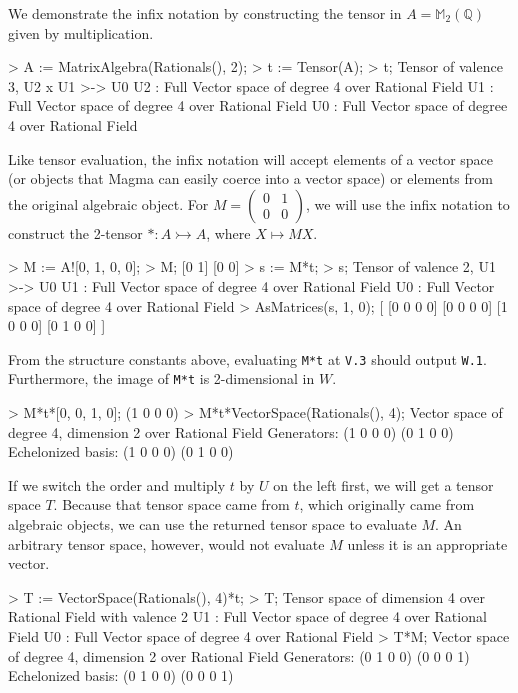 \begin{example}[BimapInfix]

We demonstrate the infix notation by constructing the tensor in
$A=\mathbb{M}_2(\mathbb{Q})$ given by multiplication.
\begin{code}
> A := MatrixAlgebra(Rationals(), 2);
> t := Tensor(A);
> t;
Tensor of valence 3, U2 x U1 >-> U0
U2 : Full Vector space of degree 4 over Rational Field
U1 : Full Vector space of degree 4 over Rational Field
U0 : Full Vector space of degree 4 over Rational Field
\end{code}

Like tensor evaluation, the infix notation will accept elements of a vector
space (or objects that \textsf{Magma} can easily coerce into a vector space) or elements
from the original algebraic object. For $M=\left(\begin{smallmatrix} 0 & 1 \\ 0
& 0 \end{smallmatrix}\right)$, we will use the infix notation to construct the
2-tensor $* : A\rightarrowtail A$, where $X\mapsto MX$. 
\begin{code}
> M := A![0, 1, 0, 0];
> M;
[0 1]
[0 0]
> s := M*t;
> s;
Tensor of valence 2, U1 >-> U0
U1 : Full Vector space of degree 4 over Rational Field
U0 : Full Vector space of degree 4 over Rational Field
> AsMatrices(s, 1, 0);
[
    [0 0 0 0]
    [0 0 0 0]
    [1 0 0 0]
    [0 1 0 0]
]
\end{code}

From the structure constants above, evaluating \texttt{M*t} at \texttt{V.3}
should output \texttt{W.1}. Furthermore, the image of \texttt{M*t} is
2-dimensional in $W$.
\begin{code}
> M*t*[0, 0, 1, 0];
(1 0 0 0)
> M*t*VectorSpace(Rationals(), 4);
Vector space of degree 4, dimension 2 over Rational Field
Generators:
(1 0 0 0)
(0 1 0 0)
Echelonized basis:
(1 0 0 0)
(0 1 0 0)
\end{code}

If we switch the order and multiply $t$ by $U$ on the left first, we will get a
tensor space $T$. Because that tensor space came from $t$, which originally came
from algebraic objects, we can use the returned tensor space to evaluate $M$. An
arbitrary tensor space, however, would not evaluate $M$ unless it is an
appropriate vector. 
\begin{code}
> T := VectorSpace(Rationals(), 4)*t;
> T;
Tensor space of dimension 4 over Rational Field with valence 2
U1 : Full Vector space of degree 4 over Rational Field
U0 : Full Vector space of degree 4 over Rational Field
> T*M;
Vector space of degree 4, dimension 2 over Rational Field
Generators:
(0 1 0 0)
(0 0 0 1)
Echelonized basis:
(0 1 0 0)
(0 0 0 1)
\end{code}
\end{example}



